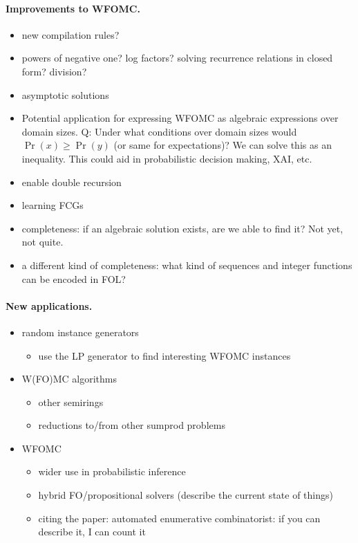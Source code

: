 \paragraph{Improvements to WFOMC.}
\begin{itemize}
\item new compilation rules?
\item powers of negative one? log factors? solving recurrence relations in closed form? division?
\item asymptotic solutions
\item Potential application for expressing WFOMC as algebraic expressions over domain sizes. Q: Under what conditions over domain sizes would $\Pr(x) \ge \Pr(y)$ (or same for expectations)? We can solve this as an inequality. This could aid in probabilistic decision making, XAI, etc.
\item enable double recursion
\item learning FCGs
\item completeness: if an algebraic solution exists, are we able to find it? Not yet, not quite.
\item a different kind of completeness: what kind of sequences and integer functions can be encoded in FOL?
\end{itemize}

\paragraph{New applications.}
\begin{itemize}
\item random instance generators
  \begin{itemize}
  \item use the LP generator to find interesting WFOMC instances
  \end{itemize}
\item W(FO)MC algorithms
  \begin{itemize}
  \item other semirings
  \item reductions to/from other sumprod problems
  \end{itemize}
\item WFOMC
  \begin{itemize}
  \item wider use in probabilistic inference
  \item hybrid FO/propositional solvers (describe the current state of things)
  \item citing the paper: automated enumerative combinatorist: if you can describe it, I can count it
  \end{itemize}
\end{itemize}


